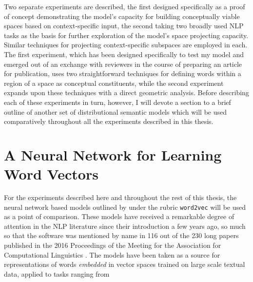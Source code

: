Two separate experiments are described, the first designed specifically as a proof of concept demonstrating the model's capacity for building conceptually viable spaces based on context-specific input, the second taking two broadly used NLP tasks as the basis for further exploration of the model's space projecting capacity.  Similar techniques for projecting context-specific subspaces are employed in each.  The first experiment, which has been designed specifically to test my model and emerged out of an exchange with reviewers in the course of preparing an article for publication, uses two straightforward techniques for defining words within a region of a space as conceptual constituents, while the second experiment expands upon these techniques with a direct geometric analysis.  Before describing each of these experiments in turn, however, I will devote a section to a brief outline of another set of distributional semantic models which will be used comparatively throughout all the experiments described in this thesis.

\section{A Neural Network for Learning Word Vectors}
For the experiments described here and throughout the rest of this thesis, the neural network based models outlined by \cite{MikolovEA2013b,MikolovEA2013c} under the rubric \texttt{word2vec} will be used as a point of comparison.  These models have received a remarkable degree of attention in the NLP literature since their introduction a few years ago, so much so that the software was mentioned by name in 116 out of the 230 long papers published in the 2016 Proceedings of the Meeting for the Association for Computational Linguistics \cite{ErkEA2016}.  The models have been taken as a source for representations of words \emph{embedded} in vector spaces trained on large scale textual data, applied to tasks ranging from 

